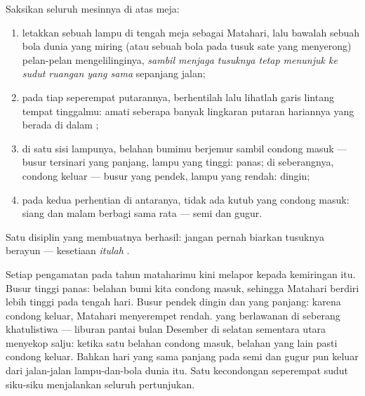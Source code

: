 \begin{method}\label{met:g6:sun-earth-moon:globe}
Saksikan seluruh mesinnya di atas meja:
\begin{enumerate}
  \item letakkan sebuah lampu di tengah meja sebagai Matahari, lalu
        bawalah sebuah bola dunia yang miring (atau sebuah bola pada
        tusuk sate yang menyerong) pelan-pelan mengelilinginya,
        \emph{sambil menjaga tusuknya tetap menunjuk ke sudut
        ruangan yang sama} sepanjang jalan;
  \item pada tiap seperempat putarannya, berhentilah lalu lihatlah
        garis lintang tempat tinggalmu: amati seberapa banyak
        lingkaran putaran hariannya yang berada di dalam ;
  \item di satu sisi lampunya, belahan bumimu berjemur sambil
        condong masuk --- busur tersinari yang panjang, lampu yang
        tinggi:  panas; di seberangnya, condong keluar ---
        busur yang pendek, lampu yang rendah:  dingin;
  \item pada kedua perhentian di antaranya, tidak ada kutub yang
        condong masuk: siang dan malam berbagi sama rata --- 
        semi dan  gugur.
\end{enumerate}
Satu disiplin yang membuatnya berhasil: jangan pernah biarkan tusuknya
berayun --- kesetiaan  \emph{itulah} .
\end{method}

\begin{example}\label{ex:g6:sun-earth-moon:clues}
Setiap pengamatan pada tahun  mataharimu kini melapor kepada
kemiringan itu. Busur tinggi  panas: belahan bumi kita condong
masuk, sehingga Matahari berdiri lebih tinggi pada tengah hari. Busur
pendek  dingin dan  yang panjang: karena condong
keluar, Matahari menyerempet rendah.  yang berlawanan di seberang
khatulistiwa --- liburan pantai bulan Desember di selatan sementara
utara menyekop salju: ketika satu belahan condong masuk, belahan yang
lain pasti condong keluar. Bahkan hari yang sama panjang pada 
semi dan  gugur pun keluar dari jalan-jalan lampu-dan-bola dunia
itu. Satu kecondongan seperempat sudut siku-siku menjalankan seluruh
pertunjukan.
\end{example}

